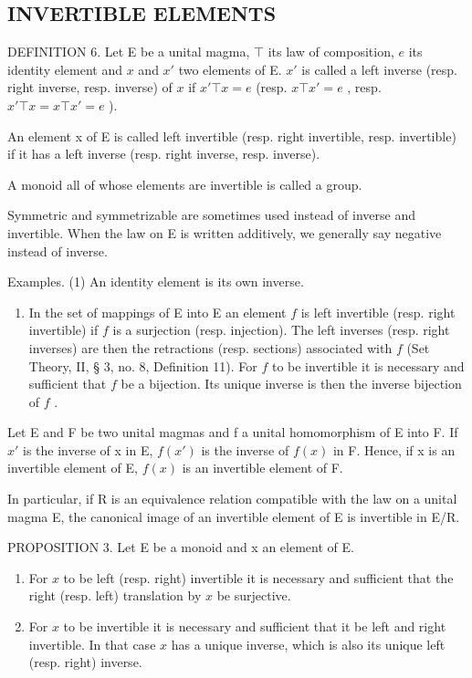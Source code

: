 \subsection{INVERTIBLE ELEMENTS}

DEFINITION 6. Let E be a unital magma, \(\top\) its law of composition, \(e\) its identity element and \(x\) and \(x'\) two elements of E. \(x'\) is called a left inverse (resp. right inverse, resp. inverse) of \(x\) if \(x' \top x = e\) (resp. \(x \top x' = e\) , resp. \(x' \top x = x \top x' = e\) ).

An element x of E is called left invertible (resp. right invertible, resp. invertible) if it has a left inverse (resp. right inverse, resp. inverse).

A monoid all of whose elements are invertible is called a group.

Symmetric and symmetrizable are sometimes used instead of inverse and invertible. When the law on E is written additively, we generally say negative instead of inverse.

Examples. (1) An identity element is its own inverse.

\begin{enumerate}
\def\labelenumi{(\arabic{enumi})}
\setcounter{enumi}{1}
\tightlist
\item
  In the set of mappings of E into E an element \(f\) is left invertible (resp. right invertible) if \(f\) is a surjection (resp. injection). The left inverses (resp. right inverses) are then the retractions (resp. sections) associated with \(f\) (Set Theory, II, § 3, no. 8, Definition 11). For \(f\) to be invertible it is necessary and sufficient that \(f\) be a bijection. Its unique inverse is then the inverse bijection of \(f\) .
\end{enumerate}

Let E and F be two unital magmas and f a unital homomorphism of E into F. If \(x'\) is the inverse of x in E, \(f(x')\) is the inverse of \(f(x)\) in F. Hence, if x is an invertible element of E, \(f(x)\) is an invertible element of F.

In particular, if R is an equivalence relation compatible with the law on a unital magma E, the canonical image of an invertible element of E is invertible in E/R.

PROPOSITION 3. Let E be a monoid and x an element of E.

\begin{enumerate}
\def\labelenumi{(\roman{enumi})}
\item
  For \(x\) to be left (resp. right) invertible it is necessary and sufficient that the right (resp. left) translation by \(x\) be surjective.
\item
  For \(x\) to be invertible it is necessary and sufficient that it be left and right invertible. In that case \(x\) has a unique inverse, which is also its unique left (resp. right) inverse.
\end{enumerate}

